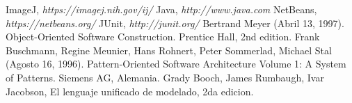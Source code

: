 \begin{thebibliography}{1}
 ImageJ, \emph{https://imagej.nih.gov/ij/}
 Java, \emph{http://www.java.com}
 NetBeans, \emph{https://netbeans.org/}
 JUnit, \emph{http://junit.org/}
 Bertrand Meyer (Abril 13, 1997). Object-Oriented Software Construction. Prentice Hall, 2nd edition.
 Frank Buschmann, Regine Meunier, Hans Rohnert, Peter Sommerlad, Michael Stal (Agosto 16, 1996). Pattern-Oriented Software Architecture Volume 1: A System of Patterns.  Siemens AG, Alemania.
 Grady Booch, James Rumbaugh, Ivar Jacobson, El lenguaje unificado de modelado, 2da edicion.
\end{thebibliography}